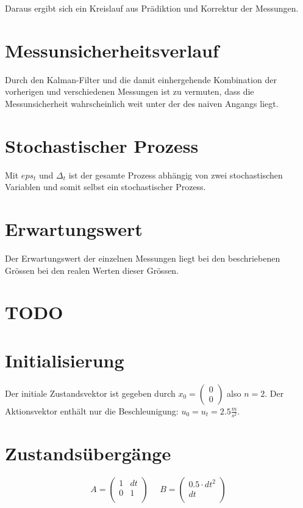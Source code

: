 \documentclass[12pt,a4paper]{article}
\begin{document}
Daraus ergibt sich ein Kreislauf aus Prädiktion und Korrektur der Messungen.

\section{Messunsicherheitsverlauf}
Durch den Kalman-Filter und die damit einhergehende Kombination der vorherigen und verschiedenen Messungen ist zu vermuten, dass die Messunsicherheit wahrscheinlich weit unter der des naiven Angangs liegt.

\section{Stochastischer Prozess}
Mit $eps_t$ und $\Delta_t$ ist der gesamte Prozess abhängig von zwei stochastischen Variablen und somit selbst ein stochastischer Prozess.

\section{Erwartungswert}
Der Erwartungswert der einzelnen Messungen liegt bei den beschriebenen Grössen bei den realen Werten dieser Grössen.

\section{TODO}

\section{Initialisierung}
Der initiale Zustandsvektor ist gegeben durch $x_0 = \begin{pmatrix}
0 \\ 0 \end{pmatrix}$ also $n = 2$. Der Aktionsvektor enthält nur die Beschleunigung: $u_0 = u_t = 2.5 \frac{m}{s^2}$.

\section{Zustandsübergänge}
\[
A = \begin{pmatrix}
1 & dt \\
0 & 1 \\
\end{pmatrix} \,\,\,\,\,\,\,\,
B = \begin{pmatrix}
0.5 \cdot dt^2 \\
dt \\
\end{pmatrix}
\]
\end{document}

